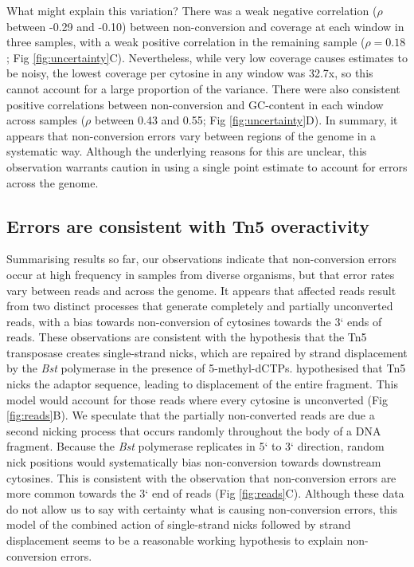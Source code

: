 \documentclass[twocolumn,twoside,lettersize]{article}
\begin{document}
What might explain this variation?
There was a weak negative correlation ($\rho$ between -0.29 and -0.10) between non-conversion and coverage at each window in three samples, with a weak positive correlation in the remaining sample ($\rho = 0.18$; Fig \ref{fig:uncertainty}C).
Nevertheless, while very low coverage causes estimates to be noisy, the lowest coverage per cytosine in any window was 32.7x, so this cannot account for a large proportion of the variance.
There were also consistent positive correlations between non-conversion and GC-content in each window across samples ($\rho$ between 0.43 and 0.55; Fig \ref{fig:uncertainty}D).
In summary, it appears that non-conversion errors vary between regions of the genome in a systematic way.
Although the underlying reasons for this are unclear, this observation warrants caution in using a single point estimate to account for errors across the genome.

\subsection{Errors are consistent with Tn5 overactivity}

Summarising results so far, our observations indicate that non-conversion errors occur at high frequency in samples from diverse organisms, but that error rates vary between reads and across the genome.
It appears that affected reads result from two distinct processes that generate completely and partially unconverted reads, with a bias towards non-conversion of cytosines towards the 3` ends of reads.
These observations are consistent with the hypothesis that the Tn5 transposase creates single-strand nicks, which are repaired by strand displacement by the \textit{Bst} polymerase in the presence of 5-methyl-dCTPs.
\textcite{lu2015improved} hypothesised that Tn5 nicks the adaptor sequence, leading to displacement of the entire fragment.
This model would account for those reads where every cytosine is unconverted (Fig \ref{fig:reads}B).
We speculate that the partially non-converted reads are due a second nicking process that occurs randomly throughout the body of a DNA fragment.
Because the \textit{Bst} polymerase replicates in 5` to 3` direction, random nick positions would systematically bias non-conversion towards downstream cytosines.
This is consistent with the observation that non-conversion errors are more common towards the 3` end of reads (Fig \ref{fig:reads}C).
Although these data do not allow us to say with certainty what is causing non-conversion errors, this model of the combined action of single-strand nicks followed by strand displacement seems to be a reasonable working hypothesis to explain non-conversion errors.
\end{document}
